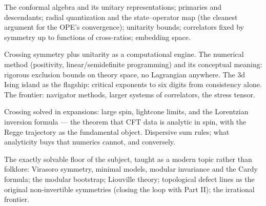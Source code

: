 The conformal algebra and its unitary representations; primaries and descendants; radial quantization and the state--operator map (the cleanest argument for the OPE's convergence); unitarity bounds; correlators fixed by symmetry up to functions of cross-ratios; embedding space.

Crossing symmetry plus unitarity as a computational engine. The numerical method (positivity, linear/semidefinite programming) and its conceptual meaning: rigorous exclusion bounds on theory space, no Lagrangian anywhere. The 3d Ising island as the flagship: critical exponents to six digits from consistency alone. The frontier: navigator methods, larger systems of correlators, the stress tensor.

Crossing solved in expansions: large spin, lightcone limits, and the Lorentzian inversion formula --- the theorem that CFT data is analytic in spin, with the Regge trajectory as the fundamental object. Dispersive sum rules; what analyticity buys that numerics cannot, and conversely.

The exactly solvable floor of the subject, taught as a modern topic rather than folklore: Virasoro symmetry, minimal models, modular invariance and the Cardy formula; the modular bootstrap; Liouville theory; topological defect lines as the original non-invertible symmetries (closing the loop with Part II); the irrational frontier.

